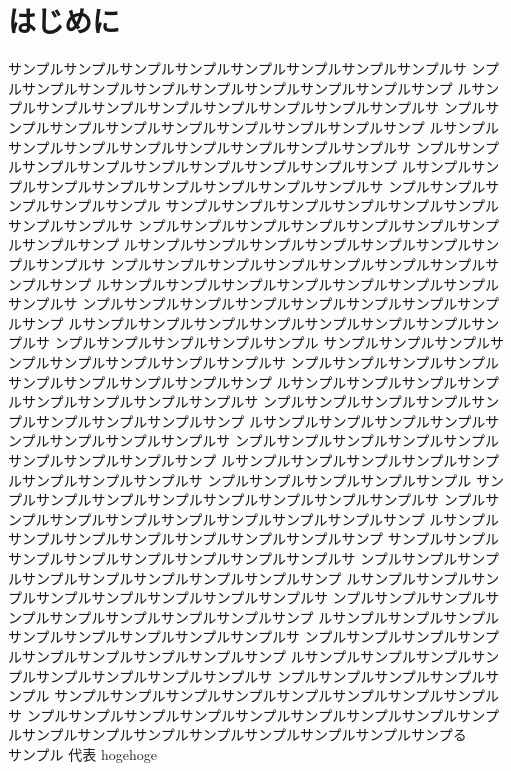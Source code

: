 
\chapter*{はじめに}

サンプルサンプルサンプルサンプルサンプルサンプルサンプルサンプルサ
ンプルサンプルサンプルサンプルサンプルサンプルサンプルサンプルサンプ
ルサンプルサンプルサンプルサンプルサンプルサンプルサンプルサンプルサ
ンプルサンプルサンプルサンプルサンプルサンプルサンプルサンプルサンプ
ルサンプルサンプルサンプルサンプルサンプルサンプルサンプルサンプルサ
ンプルサンプルサンプルサンプルサンプルサンプルサンプルサンプルサンプ
ルサンプルサンプルサンプルサンプルサンプルサンプルサンプルサンプルサ
ンプルサンプルサンプルサンプルサンプル
サンプルサンプルサンプルサンプルサンプルサンプルサンプルサンプルサ
ンプルサンプルサンプルサンプルサンプルサンプルサンプルサンプルサンプ
ルサンプルサンプルサンプルサンプルサンプルサンプルサンプルサンプルサ
ンプルサンプルサンプルサンプルサンプルサンプルサンプルサンプルサンプ
ルサンプルサンプルサンプルサンプルサンプルサンプルサンプルサンプルサ
ンプルサンプルサンプルサンプルサンプルサンプルサンプルサンプルサンプ
ルサンプルサンプルサンプルサンプルサンプルサンプルサンプルサンプルサ
ンプルサンプルサンプルサンプルサンプル
サンプルサンプルサンプルサンプルサンプルサンプルサンプルサンプルサ
ンプルサンプルサンプルサンプルサンプルサンプルサンプルサンプルサンプ
ルサンプルサンプルサンプルサンプルサンプルサンプルサンプルサンプルサ
ンプルサンプルサンプルサンプルサンプルサンプルサンプルサンプルサンプ
ルサンプルサンプルサンプルサンプルサンプルサンプルサンプルサンプルサ
ンプルサンプルサンプルサンプルサンプルサンプルサンプルサンプルサンプ
ルサンプルサンプルサンプルサンプルサンプルサンプルサンプルサンプルサ
ンプルサンプルサンプルサンプルサンプル
サンプルサンプルサンプルサンプルサンプルサンプルサンプルサンプルサ
ンプルサンプルサンプルサンプルサンプルサンプルサンプルサンプルサンプ
ルサンプルサンプルサンプルサンプルサンプルサンプルサンプルサンプ
サンプルサンプルサンプルサンプルサンプルサンプルサンプルサンプルサ
ンプルサンプルサンプルサンプルサンプルサンプルサンプルサンプルサンプ
ルサンプルサンプルサンプルサンプルサンプルサンプルサンプルサンプルサ
ンプルサンプルサンプルサンプルサンプルサンプルサンプルサンプルサンプ
ルサンプルサンプルサンプルサンプルサンプルサンプルサンプルサンプルサ
ンプルサンプルサンプルサンプルサンプルサンプルサンプルサンプルサンプ
ルサンプルサンプルサンプルサンプルサンプルサンプルサンプルサンプルサ
ンプルサンプルサンプルサンプルサンプル
サンプルサンプルサンプルサンプルサンプルサンプルサンプルサンプルサ
ンプルサンプルサンプルサンプルサンプルサンプルサンプルサンプルサンプ
ルサンプルサンプルサンプルサンプルサンプルサンプルサンプルサンプる \\

サンプル 代表 hogehoge








